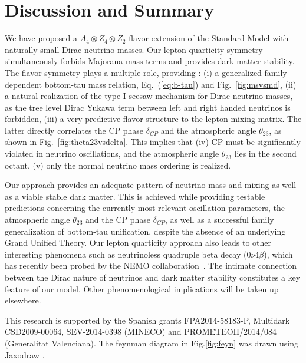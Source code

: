 \documentclass[english,10pt,aps,prd,a4paper,preprintnumbers,floatfix,nofootinbib,showpacs,superscriptaddress]{revtex4-1}
\newcommand{\sm}{{Standard Model }}
\begin{document}
\section{Discussion and Summary }
\label{sec:summary-conclusions-}

We have proposed a $A_4 \otimes Z_4 \otimes Z_2$ flavor extension of
the \sm with naturally small Dirac neutrino masses. Our lepton
quarticity symmetry simultaneously forbids Majorana mass terms and
provides dark matter stability. The flavor symmetry plays a multiple
role, providing : 
%
(i) a generalized family-dependent bottom-tau mass relation, Eq.~(\ref{eq:b-tau}) and Fig.~\ref{fig:msvsmd},
(ii)  a natural realization of the type-I seesaw mechanism for Dirac neutrino masses, as the tree level Dirac Yukawa term between left and right handed neutrinos is forbidden,
(iii)  a very predictive flavor structure to the lepton mixing
matrix. The latter directly correlates the CP phase $\delta_{CP}$ and the atmospheric angle $\theta_{23}$, as shown in
Fig.~\ref{fig:theta23vsdelta}. This implies that 
(iv) CP must be significantly violated in neutrino oscillations, and the atmospheric angle $\theta_{23}$ lies in the second octant,
(v) only the normal neutrino mass ordering is realized.

Our approach provides an adequate pattern of neutrino mass and mixing
as well as a viable stable dark matter.
%
This is achieved while providing testable predictions concerning the
currently most relevant oscillation parameters, the atmospheric angle
$\theta_{23}$ and the CP phase $\delta_{CP}$, as well as a successful
family generalization of bottom-tau unification, despite the absence
of an underlying Grand Unified Theory.
Our lepton quarticity approach also leads to other interesting
phenomena such as neutrinoless quadruple beta decay ($0 \nu 4 \beta$),
which has recently been probed by the NEMO
collaboration~\cite{Arnold:2017bnh}. The intimate connection between
the Dirac nature of neutrinos and dark matter stability constitutes a
key feature of our model. Other phenomenological implications will be
taken up elsewhere.

\begin{acknowledgments}

  This research is supported by the Spanish grants FPA2014-58183-P,
  Multidark CSD2009-00064, SEV-2014-0398 (MINECO) and
  PROMETEOII/2014/084 (Generalitat Valenciana). The feynman diagram in
  Fig.\ref{fig:feyn} was drawn using Jaxodraw \cite{Binosi:2003yf}.

\end{acknowledgments}
\end{document}
